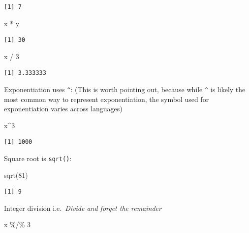 \documentclass[
]{book}
\newenvironment{Shaded}{\begin{snugshade}}{\end{snugshade}}
\newcommand{\DecValTok}[1]{\textcolor[rgb]{0.00,0.00,0.81}{#1}}
\newcommand{\FunctionTok}[1]{\textcolor[rgb]{0.00,0.00,0.00}{#1}}
\newcommand{\NormalTok}[1]{#1}
\newcommand{\SpecialCharTok}[1]{\textcolor[rgb]{0.00,0.00,0.00}{#1}}
\begin{document}
\begin{verbatim}
[1] 7
\end{verbatim}

\begin{Shaded}
\begin{Highlighting}[]
\NormalTok{x }\SpecialCharTok{*}\NormalTok{ y}
\end{Highlighting}
\end{Shaded}

\begin{verbatim}
[1] 30
\end{verbatim}

\begin{Shaded}
\begin{Highlighting}[]
\NormalTok{x }\SpecialCharTok{/} \DecValTok{3}
\end{Highlighting}
\end{Shaded}

\begin{verbatim}
[1] 3.333333
\end{verbatim}

Exponentiation uses \texttt{\^{}}:
(This is worth pointing out, because while \texttt{\^{}} is likely the most common way to represent exponentiation, the symbol used for exponentiation varies across languages)

\begin{Shaded}
\begin{Highlighting}[]
\NormalTok{x}\SpecialCharTok{\^{}}\DecValTok{3}
\end{Highlighting}
\end{Shaded}

\begin{verbatim}
[1] 1000
\end{verbatim}

Square root is \texttt{sqrt()}:

\begin{Shaded}
\begin{Highlighting}[]
\FunctionTok{sqrt}\NormalTok{(}\DecValTok{81}\NormalTok{)}
\end{Highlighting}
\end{Shaded}

\begin{verbatim}
[1] 9
\end{verbatim}

Integer division
i.e.~\emph{Divide and forget the remainder}

\begin{Shaded}
\begin{Highlighting}[]
\NormalTok{x }\SpecialCharTok{\%/\%} \DecValTok{3}
\end{Highlighting}
\end{Shaded}
\end{document}
